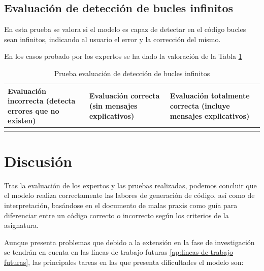 \subsection{Evaluación de detección de bucles infinitos}

En esta prueba se valora si el modelo es capaz de detectar en el código bucles sean infinitos, indicando al usuario el error y la corrección del mismo.

En los casos probado por los expertos se ha dado la valoración de la Tabla \ref{tabla:evaluacion-ej6}

\begin{table}[htb]
    \centering
    \begin{tabular}{| >{\arraybackslash}m{}| >{\arraybackslash}m{} | >{\arraybackslash}m{}|} \hline
    \vspace{0.5em}  Evaluación incorrecta (detecta errores que no existen) \vspace{0.5em} &  Evaluación correcta (sin mensajes explicativos) & Evaluación totalmente correcta (incluye mensajes explicativos) \\ \hline
     &  & \multicolumn{1}{|c|}{X} \\ \hline 
    \end{tabular}\caption{Prueba evaluación de detección de bucles infinitos}
    \label{tabla:evaluacion-ej6}
\end{table}

\section{Discusión}

Tras la evaluación de los expertos y las pruebas realizadas, podemos concluir que el modelo realiza correctamente las labores de generación de código, así como de interpretación, basándose en el documento de malas praxis como guía para diferenciar entre un código correcto o incorrecto según los criterios de la asignatura.

Aunque presenta problemas que debido a la extensión en la fase de investigación se tendrán en cuenta en las líneas de trabajo futuras \ref{ap:lineas de trabajo futuras}, las principales tareas en las que presenta dificultades el modelo son:

